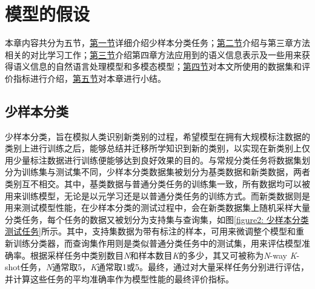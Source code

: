 \chapter[\hspace{0pt}模型的假设]{{\heiti{}\hspace{0pt}模型的假设}}

\removelofgap
\removelotgap

本章内容共分为五节，\hyperref[section2: 少样本分类]{第一节}详细介绍少样本分类任务；\hyperref[section2: 对比学习]{第二节}介绍与第三章方法相关的对比学习工作；\hyperref[section2: 语义信息表示]{第三节}介绍第四章方法应用到的语义信息表示及一些用来获得语义信息的自然语言处理模型和多模态模型；\hyperref[section2: 数据集及评价指标]{第四节}对本文所使用的数据集和评价指标进行介绍，\hyperref[section2: 本章小结]{第五节}对本章进行小结。

\section[\hspace{-2pt}少样本分类]{{\heiti{} \hspace{-8pt}少样本分类}}\label{section2: 少样本分类}

少样本分类，旨在模拟人类识别新类别的过程，希望模型在拥有大规模标注数据的类别上进行训练之后，能够总结并迁移所学知识到新的类别，以实现在新类别上仅用少量标注数据进行训练便能够达到良好效果的目的。与常规分类任务将数据集划分为训练集与测试集不同，少样本分类数据集被划分为基类数据和新类数据，两者类别互不相交。其中，基类数据与普通分类任务的训练集一致，所有数据均可以被用来训练模型，无论是以元学习还是以普通分类任务的训练方式。而新类数据则是用来测试模型性能，在少样本分类的测试过程中，会在新类数据集上随机采样大量分类任务，每个任务的数据又被划分为支持集与查询集，如图\ref{figure2: 少样本分类测试任务}所示。其中，支持集数据为带有标注的样本，可用来微调整个模型和重新训练分类器，而查询集作用则是类似普通分类任务中的测试集，用来评估模型准确率。根据采样任务中类别数目\emph{N}和样本数目\emph{K}的多少，其又可被称为\emph{N}-way \emph{K}-shot任务，\emph{N}通常取5，\emph{K}通常取1或5。最终，通过对大量采样任务分别进行评估，并计算这些任务的平均准确率作为模型性能的最终评价指标。

